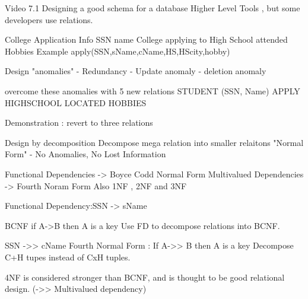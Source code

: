 Video 7.1
Designing a good schema for a database
Higher Level Tools , but some developers use relations.

College Application Info
SSN  name
College applying to
High School attended
Hobbies
Example
apply(SSN,sName,cName,HS,HScity,hobby)

Design "anomalies" 
- Redundancy
- Update anomaly
- deletion anomaly

overcome these anomalies with 5 new relations
STUDENT (SSN,  Name)
APPLY
HIGHSCHOOL
LOCATED
HOBBIES

Demonstration : revert to three relations

Design by decomposition
Decompose mega relation into smaller relaitons
"Normal Form" - No Anomalies, No Lost Information

Functional Dependencies -> Boyce Codd Normal Form
Multivalued Dependencies -> Fourth Noram Form
Also 1NF , 2NF and 3NF

Functional Dependency:SSN -> sName

BCNF if A->B then A is a key
Use FD to decompose relations into BCNF.

SSN ->> cName
Fourth Normal Form : If A->> B then A is a key
Decompose C+H tupes instead of CxH tuples.

4NF is considered stronger than BCNF, and is thought to be good relational design.
(->> Multivalued dependency)
